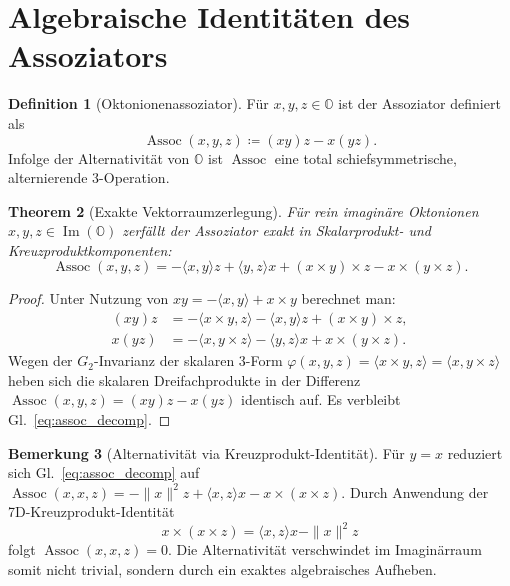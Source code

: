\documentclass[11pt,a4paper]{article}
\newtheorem{theorem}{Theorem}[section]
\theoremstyle{definition}
\newtheorem{definition}[theorem]{Definition}
\newtheorem{remark}[theorem]{Bemerkung}
\newcommand{\Oalg}{\mathbb{O}}
\newcommand{\ImO}{\operatorname{Im}(\mathbb{O})}
\newcommand{\Assoc}{\operatorname{Assoc}}
\begin{document}
	\section{Algebraische Identitäten des Assoziators}
	\begin{definition}[Oktonionenassoziator]
		Für $x, y, z \in \Oalg$ ist der Assoziator definiert als
		\begin{equation}
			\Assoc(x,y,z) \coloneqq (xy)z - x(yz).
		\end{equation}
		Infolge der Alternativität von $\Oalg$ ist $\Assoc$ eine total schiefsymmetrische, alternierende 3-Operation.
	\end{definition}
	\begin{theorem}[Exakte Vektorraumzerlegung]
		Für rein imaginäre Oktonionen $x, y, z \in \ImO$ zerfällt der Assoziator exakt in Skalarprodukt- und Kreuzproduktkomponenten:
		\begin{equation}
			\label{eq:assoc_decomp}
			\Assoc(x,y,z) = -\langle x,y \rangle z + \langle y,z \rangle x + (x \times y) \times z - x \times (y \times z).
		\end{equation}
	\end{theorem}
	\begin{proof}
		Unter Nutzung von $xy = -\langle x,y \rangle + x \times y$ berechnet man:
		\begin{align}
			(xy)z &= -\langle x \times y, z \rangle - \langle x,y \rangle z + (x \times y) \times z, \\
			x(yz) &= -\langle x, y \times z \rangle - \langle y,z \rangle x + x \times (y \times z).
		\end{align}
		Wegen der $G_2$-Invarianz der skalaren 3-Form $\varphi(x,y,z) = \langle x \times y, z \rangle = \langle x, y \times z \rangle$ heben sich die skalaren Dreifachprodukte in der Differenz $\Assoc(x,y,z) = (xy)z - x(yz)$ identisch auf. Es verbleibt Gl.~\eqref{eq:assoc_decomp}.
	\end{proof}
	\begin{remark}[Alternativität via Kreuzprodukt-Identität]
		Für $y = x$ reduziert sich Gl.~\eqref{eq:assoc_decomp} auf $\Assoc(x,x,z) = -\|x\|^2 z + \langle x,z \rangle x - x \times (x \times z)$. Durch Anwendung der 7D-Kreuzprodukt-Identität
		\begin{equation}
			x \times (x \times z) = \langle x,z \rangle x - \|x\|^2 z
		\end{equation}
		folgt $\Assoc(x,x,z) = 0$. Die Alternativität verschwindet im Imaginärraum somit nicht trivial, sondern durch ein exaktes algebraisches Aufheben.
	\end{remark}
\end{document}
